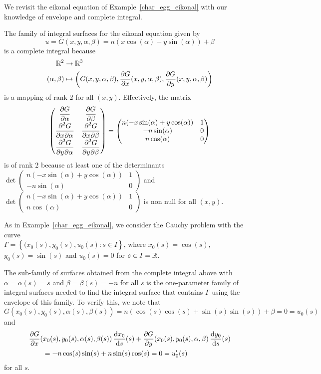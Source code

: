\begin{egg}
We revisit the eikonal equation of Example~\ref{char_egg_eikonal} with
our knowledge of envelope and complete integral.

The family of integral surfaces for the eikonal equation given by
\[
u = G(x,y,\alpha,\beta) = n(x\cos(\alpha) + y \sin(\alpha)) + \beta
\]
is a complete integral because
\[
\begin{split}
\RR^2 &\rightarrow \RR^3  \\
(\alpha,\beta) &\mapsto \left(G(x,y,\alpha,\beta),
\pdydx{G}{x}(x,y,\alpha,\beta) , \pdydx{G}{y}(x,y,\alpha,\beta) \right)
\end{split}
\]
is a mapping of rank $2$ for all $(x,y)$.  Effectively, the matrix
\[
\begin{pmatrix}
\displaystyle \pdydx{G}{\alpha} & \displaystyle \pdydx{G}{\beta} \\
\displaystyle \pdydxnm{G}{x}{\alpha}{2}{}{} &
\displaystyle \pdydxnm{G}{x}{\beta}{2}{}{} \\
\displaystyle \pdydxnm{G}{y}{\alpha}{2}{}{} &
\displaystyle \pdydxnm{G}{y}{\beta}{2}{}{} \\
\end{pmatrix}
=
\begin{pmatrix}
n(- x\sin(\alpha) + y \cos(\alpha)) & 1 \\
-n\sin(\alpha) & 0 \\
n\cos(\alpha) & 0
\end{pmatrix}
\]
is of rank $2$ because at least one of the determinants
$\displaystyle \det
\begin{pmatrix} n(- x\sin(\alpha) + y \cos(\alpha)) & 1 \\ -n\sin(\alpha) & 0
\end{pmatrix}$
and
$\displaystyle \det
\begin{pmatrix} n(- x\sin(\alpha) + y \cos(\alpha)) & 1 \\ n\cos(\alpha) & 0
\end{pmatrix}$
is non null for all $(x,y)$.

As in Example~\ref{char_egg_eikonal}, we consider the Cauchy problem
with the curve \\
$\displaystyle \Gamma = \left\{ (x_0(s), y_0(s), u_0(s) : s \in I\right\}$,
where $x_0(s)= \cos(s)$, $y_0(s) = \sin(s)$ and $u_0(s)=0$ for $s \in I = \RR$.

The sub-family of surfaces obtained from the complete integral above
with $\alpha = \alpha(s) = s$ and $\beta= \beta(s) = -n$ for all $s$
is the one-parameter family of integral surfaces needed to find the
integral surface that contains $\Gamma$ using the envelope of this
family.  To verify this, we note that
\[
G(x_0(s),y_0(s),\alpha(s),\beta(s)) = n(\cos(s)\cos(s)
+ \sin(s)\sin(s)) + \beta = 0 = u_0(s)
\]
and
\begin{align*}
&\pdydx{G}{x}(x_0(s),y_0(s), \alpha(s), \beta(s))\, \dydx{x_0}{s}(s)
+ \pdydx{G}{y}(x_0(s),y_0(s), \alpha, \beta)\, \dydx{y_0}{s}(s) \\
&\qquad = -n\cos(s)\sin(s) + n \sin(s)\cos(s) = 0 = u_0'(s)
\end{align*}
for all $s$.


\end{egg}
